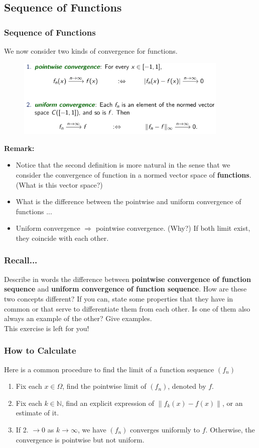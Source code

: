 \documentclass[10pt, t]{beamer}
\newcommand{\N}{\mathbb{N}}
\newcommand{\nullspace}{~\\[15pt]}
\begin{document}
\subsection{Sequence of Functions}
\begin{frame}
    \frametitle{Sequence of Functions}
    We now consider two kinds of convergence for functions.
    \begin{figure}[H]
        \centering
        \includegraphics[width=0.9\textwidth]{2020-11-11-12-40-26.png}
    \end{figure}
    \textbf{Remark:}
    \begin{itemize}
        \item 
        Notice that the second definition is more natural in the sense that we consider the convergence of function in a normed vector space of \textbf{functions}. (What is this vector space?)
        \item  What is the difference between the pointwise and uniform convergence of functions ... 
        \item Uniform convergence $\Rightarrow$ pointwise convergence. (Why?) If both limit exist, they coincide with each other.
    \end{itemize} 
\end{frame}

\begin{frame}
    \frametitle{Recall...}

    Describe in words the difference between \textbf{pointwise convergence of function sequence} and \textbf{uniform convergence of function sequence}. How are these two concepts different? If you can, state some properties that they have in common or that serve to differentiate them from each other. Is one of them also always an example of the other? Give examples.
    \nullspace
    This exercise is left for you!
\end{frame}

\begin{frame}
    \frametitle{How to Calculate}

    Here is a common procedure to find the limit of a function sequence $(f_n)$
    \begin{enumerate}
        \item Fix each $x\in\Omega$, find the pointwise limit of $(f_n)$, denoted by $f$.
        \item Fix each $k\in \N$, find an explicit expression of $\|f_k(x)-f(x)\|$, or an estimate of it.
        \item If 2. $\to 0$ as $k\to \infty$, we have $(f_n)$ converges uniformly to $f$. Otherwise, the convergence is pointwise but not uniform.
    \end{enumerate}

\end{frame}
\end{document}
